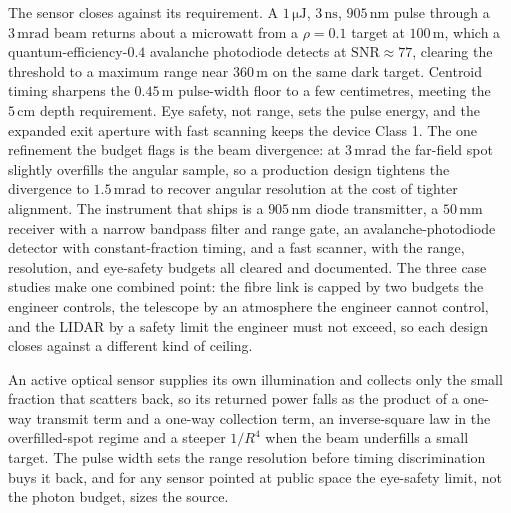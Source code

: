 The sensor closes against its requirement. A $1\,\si{\micro\joule}$,
$3\,\si{\nano\second}$, $905\,\si{\nano\meter}$ pulse through a
$3\,\si{\milli\radian}$ beam returns about a microwatt from a $\rho = 0.1$
target at $100\,\si{\meter}$, which a quantum-efficiency-$0.4$ avalanche
photodiode detects at $\text{SNR}\approx 77$, clearing the threshold to a
maximum range near $360\,\si{\meter}$ on the same dark target. Centroid timing
sharpens the $0.45\,\si{\meter}$ pulse-width floor to a few centimetres,
meeting the $5\,\si{\centi\meter}$ depth requirement. Eye safety, not range,
sets the pulse energy, and the expanded exit aperture with fast scanning keeps
the device Class 1. The one refinement the budget flags is the beam
divergence: at $3\,\si{\milli\radian}$ the far-field spot slightly overfills
the angular sample, so a production design tightens the divergence to
$1.5\,\si{\milli\radian}$ to recover angular resolution at the cost of tighter
alignment. The instrument that ships is a $905\,\si{\nano\meter}$ diode
transmitter, a $50\,\si{\milli\meter}$ receiver with a narrow bandpass filter
and range gate, an avalanche-photodiode detector with constant-fraction
timing, and a fast scanner, with the range, resolution, and eye-safety budgets
all cleared and documented. The three case studies make one combined point:
the fibre link is capped by two budgets the engineer controls, the telescope
by an atmosphere the engineer cannot control, and the LIDAR by a safety limit
the engineer must not exceed, so each design closes against a different kind of
ceiling.

\begin{principle}
An active optical sensor supplies its own illumination and collects only the
small fraction that scatters back, so its returned power falls as the product
of a one-way transmit term and a one-way collection term, an inverse-square
law in the overfilled-spot regime and a steeper $1/R^{4}$ when the beam
underfills a small target. The pulse width sets the range resolution before
timing discrimination buys it back, and for any sensor pointed at public space
the eye-safety limit, not the photon budget, sizes the source.
\end{principle}

